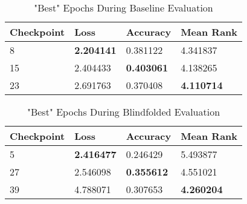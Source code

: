 \begin{table}[h]
\centering
\caption{"Best" Epochs During Baseline Evaluation}
\begin{tabular}{l | l | l | l}
Checkpoint & Loss & Accuracy & Mean Rank \\
\hline
8 & \textbf{2.204141} & 0.381122 & 4.341837 \\
15 & 2.404433 & \textbf{0.403061} & 4.138265 \\
23 & 2.691763 & 0.370408 & \textbf{4.110714}
\end{tabular}
\label{tab:best_baseline}
\end{table}

\begin{table}[h]
\centering
\caption{"Best" Epochs During Blindfolded Evaluation}
\begin{tabular}{l | l | l | l}
Checkpoint & Loss & Accuracy & Mean Rank \\
\hline
5 & \textbf{2.416477} & 0.246429 & 5.493877 \\
27 & 2.546098 & \textbf{0.355612} & 4.551021 \\
39 & 4.788071 & 0.307653 & \textbf{4.260204}
\end{tabular}
\label{tab:best_blindfolded}
\end{table}


